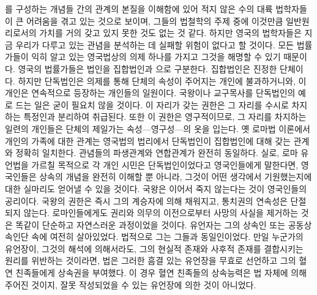 를 구성하는 개념들 간의 관계의 본질을 이해함에 있어
적지 않은 수의 대륙 법학자들이
큰 어려움을 겪고 있는 것으로 보이며,
그들의 법철학의 주제 중에 이것만큼
일반원리로서의 가치를 거의 갖고 있지 못한 것도 없는 것 같다.
하지만 영국의 법학자들은 지금 우리가 다루고 있는 관념을 분석하는 데
실패할 위험이 없다고 할 것이다.
모든 법률가들이 익히 알고 있는 영국법상의 의제 하나를 가지고
그것을 해명할 수 있기 때문이다.
영국의 법률가들은 법인을 집합법인과
으로 구분한다.
집합법인은 진정한 단체이다.
하지만 단독법인은 의제를 통해 단체의 속성이
주어지는 개인에 불과하거니와,
이 개인은 연속적으로 등장하는 개인들의 일원이다.
국왕이나 교구목사를
단독법인의 예로 드는 일은 굳이 필요치 않을 것이다.
이 자리가 갖는 권한은 그 자리를 수시로 차지하는 특정인과 분리하여 취급된다.
또한 이 권한은 영구적이므로, 그 자리를 차지하는 일련의 개인들은
단체의 제일가는 속성---영구성---의 옷을 입는다.
옛 로마법 이론에서 개인의 가족에 대한 관계는
영국법의 법리에서 단독법인이 집합법인에 대해 갖는 관계와 정확히 일치한다.
관념들의 파생관계와 연합관계가 완전히 동일하다.
실로, 로마 유언법을 가르칠 목적으로
각 개인 시민은 단독법인이었다고 영국인들에게 말한다면,
영국인들은 상속의 개념을 완전히 이해할 뿐 아니라,
그것이 어떤 생각에서 기원했는지에 대한 실마리도 얻어낼 수 있을 것이다.
국왕은 이어서 죽지 않는다는 것이 영국인들의 공리이다.
국왕의 권한은 즉시 그의 계승자에 의해 채워지고,
통치권의 연속성은 단절되지 않는다.
로마인들에게도
권리와 의무의 이전으로부터 사망의 사실을 제거하는 것은
똑같이 단순하고 자연스러운 과정이었을 것이다.
유언자는 그의 상속인 또는 공동상속인단 속에 여전히 살아있었다.
법적으로 그는 그들과 동일인이었다.
만일 누군가의 유언장이, 그것의 해석에 의해서라도,
그의 현실적 존재와 사후적 존재를 결합시키는 원리를
위반하는 것이라면,
법은 그러한 흠결 있는 유언장을 무효로 선언하고
그의 혈연 친족들에게 상속권을 부여했다.
이 경우 혈연 친족들의 상속능력은 법 자체에 의해 주어진 것이지,
잘못 작성되었을 수 있는 유언장에 의한 것이 아니었다.

